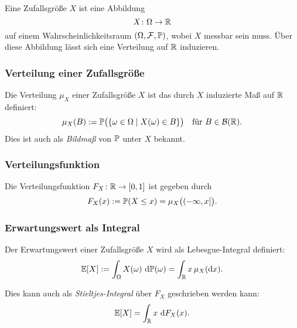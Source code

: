 Eine Zufallsgröße $X$ ist eine Abbildung
\[
X \colon \Omega \to \R
\]
auf einem Wahrscheinlichkeitsraum $(\Omega, \mathcal{F}, \P)$, wobei $X$ messbar sein muss. 
Über diese Abbildung lässt sich eine Verteilung auf $\R$ induzieren.

\subsubsection*{Verteilung einer Zufallsgröße}

Die Verteilung $\mu_X$ einer Zufallsgröße $X$ ist das durch $X$ induzierte Maß auf $\R$ definiert:
\[
\mu_X(B) := \P\big(\{ \omega \in \Omega \mid X(\omega) \in B \} \big)
\quad \text{für } B \in \mathcal{B}(\R).
\]
Dies ist auch als \emph{Bildmaß} von $\P$ unter $X$ bekannt.

\subsubsection*{Verteilungsfunktion}

Die Verteilungsfunktion $F_X \colon \R \to [0,1]$ ist gegeben durch
\[
F_X(x) := \P(X \leq x) = \mu_X\big((-\infty, x]\big).
\]

\subsubsection*{Erwartungswert als Integral}

Der Erwartungswert einer Zufallsgröße $X$ wird als Lebesgue-Integral definiert:
\[
\E[X] := \int_\Omega X(\omega) \, \diff \P(\omega) = \int_{\R} x \, \mu_X(\diff x).
\]

Dies kann auch als \emph{Stieltjes-Integral} über $F_X$ geschrieben werden kann:
\[
\E[X] = \int_\R x \, \diff F_X(x).
\]

